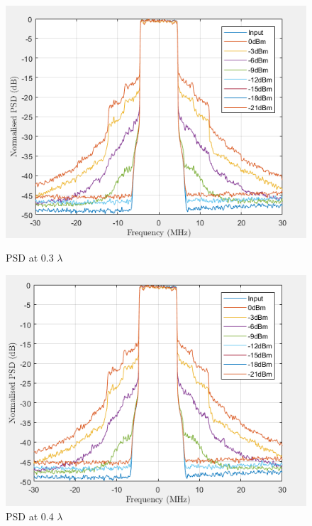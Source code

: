 \begin{figure}[H]
  \centering
  \begin{minipage}[b]{0.5\textwidth}
	\includegraphics[scale = 0.5]{figures/measurement/two_antenna/psd_03.png}
	\caption{PSD at 0.3 $\lambda$}
    \label{fig:psd03}
  \end{minipage}
  \hfill
  \begin{minipage}[b]{0.4\textwidth}
\includegraphics[scale = 0.5]{figures/measurement/two_antenna/psd_04.png}
\caption{PSD at 0.4 $\lambda$}
    \label{fig:psd04}
  \end{minipage}
\end{figure}

